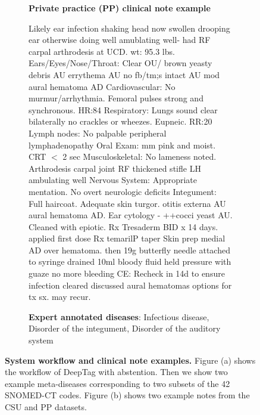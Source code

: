 \documentclass[fleqn,10pt]{wlscirep}
\begin{document}
\begin{figure}[h!]
\begin{subfigure}[b]{\textwidth}
        \textbf{Private practice (PP) clinical note example}
        \begin{framed}
        Likely ear infection  shaking head  now swollen  drooping ear otherwise doing well  amublating well- had RF carpal arthrodesis at UCD. wt:  95.3 lbs.    Ears/Eyes/Nose/Throat: Clear OU/ brown yeasty debris AU errythema AU no fb/tm;s intact AU mod aural hematoma AD  Cardiovascular:   No murmur/arrhythmia.  Femoral pulses strong and synchronous. HR:84  Respiratory:  Lungs sound clear bilaterally  no crackles or wheezes. Eupneic.  RR:20  Lymph nodes:   No palpable peripheral lymphadenopathy  Oral Exam:  mm pink and moist.   CRT $<$ 2 sec  Musculoskeletal:  No lameness noted. Arthrodesis carpal joint RF  thickened stifle LH  ambulating well  Nervous System:   Appropriate mentation.  No overt neurologic deficits  Integument:  Full haircoat. Adequate skin turgor. otitis externa AU  aural hematoma AD. Ear cytology -  ++cocci  yeast   AU.  Cleaned  with epiotic. Rx Tresaderm BID x  14 days.  applied first dose    Rx temarilP taper    Skin prep medial AD over hematoma.  then 19g butterfly needle attached to syringe  drained 10ml bloody fluid  held pressure with guaze  no more bleeding        CE: Recheck in 14d to ensure infection cleared  discussed aural hematomas  options for tx  sx. may recur. 
        \vspace{0.1in}
    
        \textbf{Expert annotated diseases}: Infectious disease, Disorder of the integument, Disorder of the auditory system
        \end{framed}
        \caption{}
        \label{fig:csu-pp-text-examples}
    \end{subfigure}
    \caption{{\bf System workflow and clinical note examples.} Figure (a) shows  the workflow of DeepTag  with abstention. Then we show two example meta-diseases corresponding to two subsets of the 42 SNOMED-CT codes. Figure (b) shows two example notes from the CSU and PP datasets. }
    \label{fig:figure1}
\end{figure}
\end{document}
